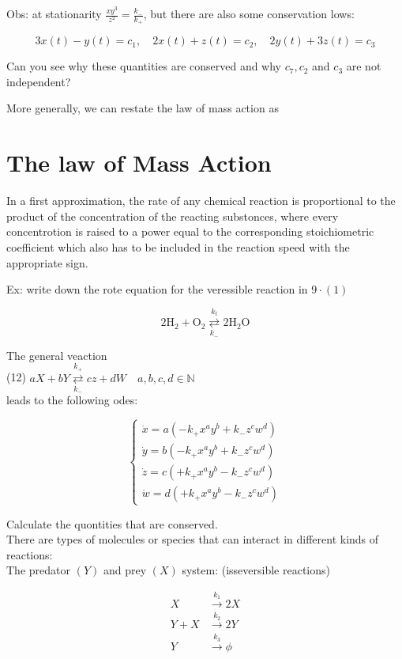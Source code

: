\documentclass[10pt]{article}
\begin{document}
Obs: at stationarity $\frac{x y^{3}}{z^{2}}=\frac{k_{-}}{k_{+}}$, but there are also some conservation lows:

$$
3 x(t)-y(t)=c_{1}, \quad 2 x(t)+z(t)=c_{2}, \quad 2 y(t)+3 z(t)=c_{3}
$$

Can you see why these quantities are conserved and why $c_{7}, c_{2}$ and $c_{3}$ are not independent?

More generally, we can restate the law of mass action as

\section*{The law of Mass Action}
In a first approximation, the rate of any chemical reaction is proportional to the product of the concentration of the reacting substonces, where every concentrotion is raised to a power equal to the corresponding stoichiometric coefficient which also has to be included in the reaction speed with the appropriate sign.

Ex: write down the rote equation for the veressible reaction in $9 \cdot(1)$

$$
2 \mathrm{H}_{2}+\mathrm{O}_{2} \underset{k_{-}}{\stackrel{k_{t}}{\rightleftarrows}} 2 \mathrm{H}_{2} \mathrm{O}
$$

The general veaction\\
(12) $a X+b Y \underset{k_{-}}{\stackrel{k_{+}}{\rightleftarrows}} c z+d W \quad a, b, c, d \in \mathbb{N}$\\
leads to the following odes:

$$
\left\{\begin{array}{l}
\dot{x}=a\left(-k_{+} x^{a} y^{b}+k_{-} z^{c} w^{d}\right) \\
\dot{y}=b\left(-k_{+} x^{a} y^{b}+k_{-} z^{c} w^{d}\right) \\
\dot{z}=c\left(+k_{+} x^{a} y^{b}-k_{-} z^{c} w^{d}\right) \\
\dot{w}=d\left(+k_{+} x^{a} y^{b}-k_{-} z^{c} w^{d}\right)
\end{array}\right.
$$

Calculate the quontities that are conserved.\\
There are types of molecules or species that can interact in different kinds of reactions:\\
The predator $(Y)$ and prey $(X)$ system: (isseversible reactions)


\begin{align*}
X & \xrightarrow{k_{1}} 2 X \\
Y+X & \xrightarrow{k_{2}} 2 Y  \tag{13}\\
Y & \xrightarrow{k_{3}} \phi
\end{align*}
\end{document}
